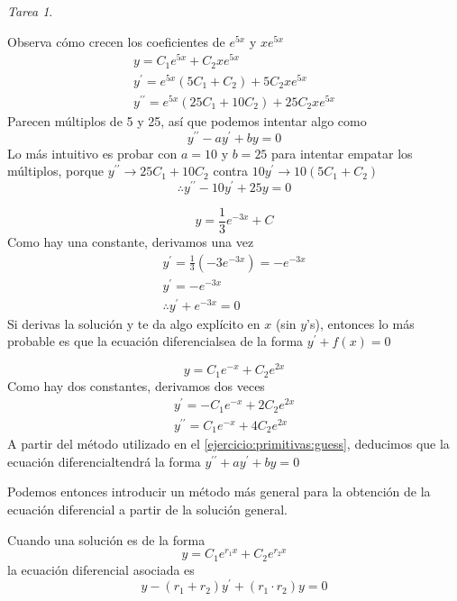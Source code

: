 \documentclass[12pt]{article} %
\theoremstyle{remark} %
\newtheorem{tarea}{Tarea}[section] %
\newcounter{ejercicio}[tarea]
\newcommand{\ed}{ecuación diferencial}
\begin{document}
\begin{tarea}
\begin{ejercicio}[1]
  Observa cómo crecen los coeficientes de $e^{5x}$ y $xe^{5x}$
  \begin{gather*}
    y = C_1e^{5x} + C_2xe^{5x}\\
    y^{\prime} = e^{5x} (5C_1 + C_2) + 5 C_2 xe^{5x}\\
    y^{\prime \prime} = e^{5x} (25C_1 + 10C_2) + 25C_2xe^{5x}
  \end{gather*}
  Parecen múltiplos de 5 y 25, así que podemos intentar algo como \[ y^{\prime \prime} - ay^{\prime} + by = 0 \]
  Lo más intuitivo es probar con $a = 10$ y $b = 25$ para intentar empatar los múltiplos, porque 
  $y^{\prime \prime} \rightarrow 25C_1 + 10C_2$ contra $10y^{\prime} \rightarrow 10(5C_1 + C_2)$
  \[ \therefore y^{\prime \prime} - 10y^{\prime} + 25y = 0 \]
  \end{ejercicio}
  \begin{ejercicio}[2]
    \[ y = \frac{1}{3} e^{-3x} + C \]
    Como hay una constante, derivamos una vez
    \begin{gather*}
      y^{\prime} = \frac{1}{3} (-3e^{-3x}) = -e^{-3x}\\
      y^{\prime} = -e^{-3x}\\
      \therefore y^{\prime} + e^{-3x} = 0
    \end{gather*}
    Si derivas la solución y te da algo explícito en $x$ (sin $y$'s), entonces lo más probable es que la \ed sea 
    de la forma $y^{\prime} + f(x) = 0$
  \end{ejercicio}
  \begin{ejercicio}[4]
    \[ y = C_1e^{-x} + C_2e^{2x} \]
    Como hay dos constantes, derivamos dos veces
    \begin{gather*}
      y^{\prime} = -C_1e^{-x} + 2C_2e^{2x}\\
      y^{\prime \prime} = C_1e^{-x} + 4C_2e^{2x}
    \end{gather*}
    A partir del método utilizado en el \cref{ejercicio:primitivas:guess}, deducimos que la \ed tendrá la forma 
    $y^{\prime \prime} + ay^{\prime} + by = 0$

    Podemos entonces introducir un método más general para la obtención de la ecuación diferencial a partir 
    de la solución general.

    Cuando una solución es de la forma \[ y = C_1e^{r_1x} + C_2e^{r_2x} \]
    la ecuación diferencial asociada es \[ y - (r_1 + r_2)y^{\prime} + (r_1 \cdot r_2)y = 0 \]


\end{ejercicio}
\end{tarea}
\end{document}
